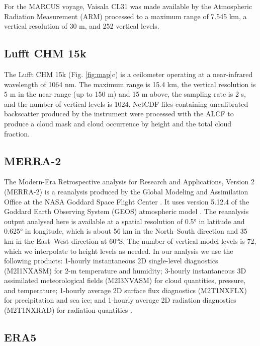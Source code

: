 \documentclass[12pt,a4paper]{article}
\begin{document}
For the MARCUS voyage, Vaisala CL31 was made available by the Atmospheric
Radiation Measurement (ARM) processed to a maximum range of 7.545 km, a
vertical resolution of 30 m, and 252 vertical levels.

\subsection{Lufft CHM 15k}
\label{sec:chm15k}

The Lufft CHM 15k (Fig. \ref{fig:map}c) is a ceilometer operating at a
near-infrared wavelength of 1064 nm. The maximum range is 15.4 km, the vertical
resolution is 5 m in the near range (up to 150 m) and 15 m above, the sampling
rate is 2 s, and the number of vertical levels is 1024.  NetCDF files
containing uncalibrated backscatter produced by the instrument were processed
with the ALCF to produce a cloud mask and cloud occurrence by height and the
total cloud fraction.


\subsection{MERRA-2}

The Modern-Era Retrospective analysis for Research and Applications, Version 2
(MERRA-2) is a reanalysis produced by the Global Modeling and Assimilation
Office at the NASA Goddard Space Flight Center \citep{gelaro2017}.  It uses
version 5.12.4 of the Goddard Earth Observing System (GEOS) atmospheric model
\citep{rienecker2008,molod2015}. The reanalysis output analysed here is
available at a spatial resolution of 0.5° in latitude and 0.625° in longitude,
which is about 56 km in the North--South direction and 35 km in the East--West
direction at 60°S. The number of vertical model levels is 72, which we
interpolate to height levels as needed. In our analysis we use the following
products: 1-hourly instantaneous 2D single-level diagnostics (M2I1NXASM) for
2-m temperature and humidity; 3-hourly instantaneous 3D assimilated
meteorological fields (M2I3NVASM) for cloud quantities, pressure, and
temperature; 1-hourly average 2D surface flux diagnostics (M2T1NXFLX) for
precipitation and sea ice; and 1-hourly average 2D radiation diagnostics
(M2T1NXRAD) for radiation quantities \citep{merra2}.

\subsection{ERA5}
\end{document}
